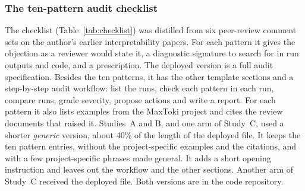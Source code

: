 \documentclass[10pt,letterpaper]{article}
\begin{document}
\subsubsection*{The ten-pattern audit checklist}
The checklist (Table~\ref{tab:checklist}) was distilled from six
peer-review comment sets on the author's earlier interpretability papers.
For each pattern it gives the objection as a reviewer would state it, a
diagnostic signature to search for in run outputs and code, and a
prescription. The deployed version is a full audit specification.
Besides the ten patterns, it has the other template sections and a
step-by-step audit workflow: list the runs, check each pattern in each
run, compare runs, grade severity, propose actions and write a report.
For each pattern it also lists examples from the MaxToki project and cites
the review documents that raised it. Studies~A and B, and one arm of
Study~C, used a shorter \emph{generic} version, about 40\% of the length
of the deployed file. It keeps the ten pattern entries, without the
project-specific examples and the citations, and with a few
project-specific phrases made general. It adds a short opening
instruction and leaves out the workflow and the other sections. Another
arm of Study~C received the deployed file. Both versions are in the code
repository.
\end{document}
